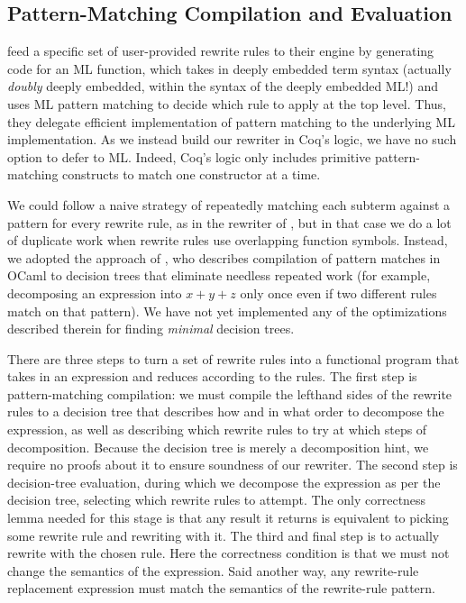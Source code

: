 \subsection{Pattern-Matching Compilation and Evaluation} \label{sec:pattern-matching-compilation-and-evaluation}

\textcite{Aehlig} feed a specific set of user-provided rewrite rules to their engine by generating code for an ML function, which takes in deeply embedded term syntax (actually \emph{doubly} deeply embedded, within the syntax of the deeply embedded ML!) and uses ML pattern matching to decide which rule to apply at the top level.
Thus, they delegate efficient implementation of pattern matching to the underlying ML implementation.
As we instead build our rewriter in Coq's logic, we have no such option to defer to ML.
Indeed, Coq's logic only includes primitive pattern-matching constructs to match one constructor at a time.

We could follow a naive strategy of repeatedly matching each subterm against a pattern for every rewrite rule, as in the rewriter of \textcite{rtac}, but in that case we do a lot of duplicate work when rewrite rules use overlapping function symbols.
Instead, we adopted the approach of \textcite{maranget2008compiling}, who describes compilation of pattern matches in OCaml to decision trees that eliminate needless repeated work (for example, decomposing an expression into $x + y + z$ only once even if two different rules match on that pattern).
We have not yet implemented any of the optimizations described therein for finding \emph{minimal} decision trees.

There are three steps to turn a set of rewrite rules into a functional program that takes in an expression and reduces according to the rules.
The first step is pattern-matching compilation: we must compile the lefthand sides of the rewrite rules to a decision tree that describes how and in what order to decompose the expression, as well as describing which rewrite rules to try at which steps of decomposition.
Because the decision tree is merely a decomposition hint, we require no proofs about it to ensure soundness of our rewriter.
The second step is decision-tree evaluation, during which we decompose the expression as per the decision tree, selecting which rewrite rules to attempt.
The only correctness lemma needed for this stage is that any result it returns is equivalent to picking some rewrite rule and rewriting with it.
The third and final step is to actually rewrite with the chosen rule.
Here the correctness condition is that we must not change the semantics of the expression.
Said another way, any rewrite-rule replacement expression must match the semantics of the rewrite-rule pattern.

